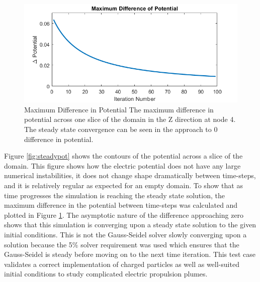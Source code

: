 \begin{figure}
    \includegraphics[width=.85\textwidth]{figures/steadyconvergance.png}
    \centering
    \caption[Maximum Difference in Potential]{Maximum Difference in Potential \textmd{The maximum difference in potential across one slice of the domain in the Z direction at node 4. The steady state convergence can be seen in the approach to 0 difference in potential.}}
    \label{fig:steadyconvergance}
\end{figure}

\indent Figure \ref{fig:steadypot} shows the contours of the potential across a slice of the domain. This figure shows how the electric potential does not have any large numerical instabilities, it does not change shape dramatically between time-steps, and it is relatively regular as expected for an empty domain. To show that as time progresses the simulation is reaching the steady state solution, the maximum difference in the potential between time-steps was calculated and plotted in Figure \ref{fig:steadyconvergance}. The asymptotic nature of the difference approaching zero shows that this simulation is converging upon a steady state solution to the given initial conditions. This is not the Gauss-Seidel solver slowly converging upon a solution because the 5\% solver requirement was used which ensures that the Gauss-Seidel is steady before moving on to the next time iteration. This test case validates a correct implementation of charged particles as well as well-suited initial conditions to study complicated electric propulsion plumes. 


